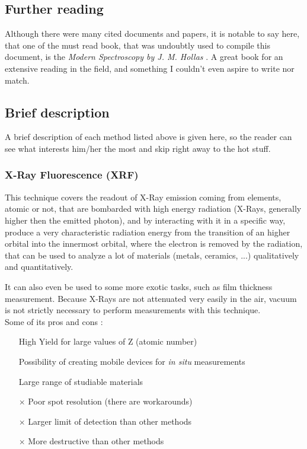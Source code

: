 \documentclass[]{article}
\begin{document}
\subsection{Further reading}
Although there were many cited documents and papers, it is notable to say here, that one of the must read book, that was undoubtly used to compile this document, is the \textit{Modern Spectroscopy by J. M. Hollas} \cite{JMH_Modern}. A great book for an extensive reading in the field, and something I couldn't even aspire to write nor match.

\subsection{Brief description}
A brief description of each method listed above is given here, so the reader can see what interests him/her the most and skip right away to the hot stuff.

\subsubsection{X-Ray Fluorescence (XRF)} \label{XRF}
This technique covers the readout of X-Ray emission coming from elements, atomic or not, that are bombarded with high energy radiation (X-Rays, generally higher then the emitted photon), and by interacting with it in a specific way, produce a very characteristic radiation energy from the transition of an higher orbital into the innermost orbital, where the electron is removed by the radiation, that can be used to analyze a lot of materials (metals, ceramics, ...) qualitatively and quantitatively. 
\par It can also even be used to some more exotic tasks, such as film thickness measurement. Because X-Rays are not attenuated very easily in the air, vacuum is not strictly necessary to perform measurements with this technique.\\

Some of its pros and cons \cite{GI_XRF}:
\begin{itemize}
\item[\checkmark] High Yield for large values of Z (atomic number)
\item[\checkmark] Possibility of creating mobile devices for \textit{in situ} measurements
\item[\checkmark] Large range of studiable materials
\item[$\times$] Poor spot resolution (there are workarounds)
\item[$\times$] Larger limit of detection than other methods
\item[$\times$] More destructive than other methods
\end{itemize}
\end{document}
